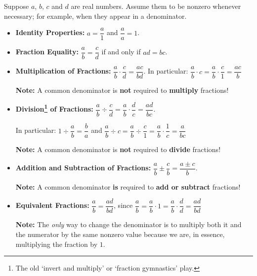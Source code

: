 \colorbox{ResultColor}{\bbm
\begin{thm}

Suppose $a$, $b$, $c$ and $d$ are real numbers.  Assume them to be nonzero whenever necessary; for example,  when they appear in a denominator.

\begin{itemize}

\item  \textbf{Identity Properties:}  $a = \dfrac{a}{1}$ and $\dfrac{a}{a} = 1$.

\item  \textbf{Fraction Equality:}  $\dfrac{a}{b} = \dfrac{c}{d}$ if and only if $ad = bc$. 

\item  \textbf{Multiplication of Fractions:}  $\dfrac{a}{b} \cdot \dfrac{c}{d} = \dfrac{ac}{bd}$. In particular:  $\dfrac{a}{b} \cdot c = \dfrac{a}{b} \cdot \dfrac{c}{1} = \dfrac{ac}{b}$

\textbf{Note:}  A common denominator is \textbf{not} required to \textbf{multiply} fractions!

\item  \textbf{Division\footnote{The old `invert and multiply' or `fraction gymnastics' play.} of Fractions:}  $\dfrac{a}{b} \div \dfrac{c}{d} = \dfrac{a}{b} \cdot \dfrac{d}{c} = \dfrac{ad}{bc}$. 

In particular: $1 \div \dfrac{a}{b} = \dfrac{b}{a}$ and  $\dfrac{a}{b} \div c = \dfrac{a}{b} \div \dfrac{c}{1}  = \dfrac{a}{b} \cdot \dfrac{1}{c} = \dfrac{a}{bc}$

\textbf{Note:}  A common denominator is \textbf{not} required to \textbf{divide} fractions!

\item  \textbf{Addition and Subtraction of Fractions:}  $\dfrac{a}{b} \pm \dfrac{c}{b} = \dfrac{a \pm c}{b}$.  

\textbf{Note:}  A common denominator \textbf{is} required to \textbf{add or subtract} fractions!

\item  \textbf{Equivalent Fractions:}  $\dfrac{a}{b} = \dfrac{ad}{bd}$, since $ \dfrac{a}{b} = \dfrac{a}{b} \cdot 1 = \dfrac{a}{b} \cdot \dfrac{d}{d} = \dfrac{ad}{bd}$

\textbf{Note:}  The \textit{only} way to change the denominator is to multiply both it and the numerator by the same nonzero value because we are, in essence, multiplying the fraction by $1$.


\end{itemize}
\end{thm}}
